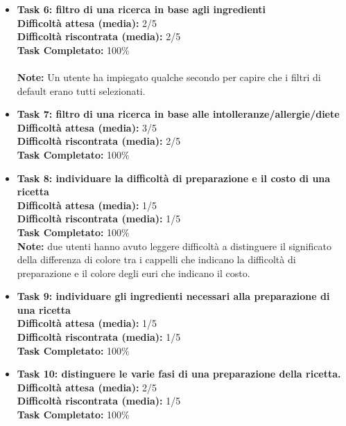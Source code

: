 \begin{itemize}
\item
\textbf{Task 6: filtro di una ricerca in base agli ingredienti}\\
\textbf{Difficoltà attesa (media):} 2/5\\
\textbf{Difficoltà riscontrata (media):} 2/5\\
\textbf{Task Completato:} 100\%\\\\
\textbf{Note:} Un utente ha impiegato qualche secondo per capire che i
filtri di default erano tutti selezionati.

\item
\textbf{Task 7: filtro di una ricerca in base alle intolleranze/allergie/diete}\\
\textbf{Difficoltà attesa (media):} 3/5\\
\textbf{Difficoltà riscontrata (media):} 2/5\\
\textbf{Task Completato:} 100\%\\

\item
\textbf{Task 8: individuare la difficoltà di preparazione e il costo di una ricetta}\\
\textbf{Difficoltà attesa (media):} 1/5\\
\textbf{Difficoltà riscontrata (media):} 1/5\\
\textbf{Task Completato:} 100\%\\
\textbf{Note:} due utenti hanno avuto leggere difficoltà a distinguere
il significato della differenza di colore tra i cappelli che indicano la
difficoltà di preparazione e il colore degli euri che indicano il
costo.

\item
\textbf{Task 9: individuare gli ingredienti necessari alla preparazione
di una ricetta}\\
\textbf{Difficoltà attesa (media):} 1/5\\
\textbf{Difficoltà riscontrata (media):} 1/5\\
\textbf{Task Completato:} 100\%\\

\item
\textbf{Task 10: distinguere le varie fasi di una preparazione della
ricetta.}\\
\textbf{Difficoltà attesa (media):} 2/5\\
\textbf{Difficoltà riscontrata (media):} 1/5\\
\textbf{Task Completato:} 100\%\\


\end{itemize}
